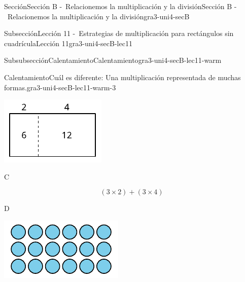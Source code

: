 \documentclass[twoside,10pt,]{article}
\begin{document}
\begin{sectionptx}{Sección}{Sección B -~Relacionemos la multiplicación y la división}{}{Sección B -~Relacionemos la multiplicación y la división}{}{}{gra3-uni4-secB}
\begin{subsectionptx}{Subsección}{Lección 11 -~Estrategias de multiplicación para rectángulos sin cuadrícula}{}{Lección 11}{}{}{gra3-uni4-secB-lec11}
\begin{subsubsectionptx}{Subsubsección}{Calentamiento}{}{Calentamiento}{}{}{gra3-uni4-secB-lec11-warm}
\begin{exploration}{Calentamiento}{Cuál es diferente: Una multiplicación representada de muchas formas.}{gra3-uni4-secB-lec11-warm-3}
\begin{sidebyside}{2}{0.05}{0.05}{0.1}
\begin{sbspanel}{0.4}
\includegraphics[width=\linewidth]{external/svg-source/tikz-file-153082.pdf}
\end{sbspanel}%
\end{sidebyside}%
\begin{sidebyside}{2}{0.05}{0.05}{0.1}%
\begin{sbspanel}{0.4}%
C%
\par
%
\begin{equation*}
(3\times 2) + (3\times 4)
\end{equation*}
%
\end{sbspanel}%
\begin{sbspanel}{0.4}%
D%
\par
\includegraphics[width=\linewidth]{external/svg-source/tikz-file-153083.pdf}
\end{sbspanel}%
\end{sidebyside}%
\end{exploration}%
\end{subsubsectionptx}
%
%
\typeout{************************************************}
\typeout{************************************************}

\end{subsectionptx}
\end{sectionptx}
\end{document}
